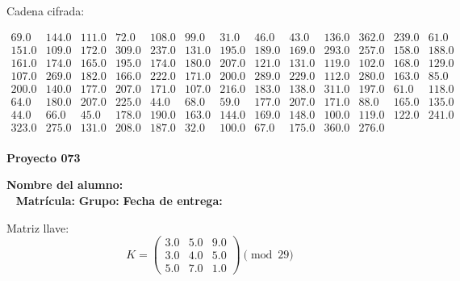 \documentclass[12pt]{article}
\begin{document}
Cadena cifrada:
\begin{center}
$\begin{array}{lllllllllllll}
69.0 & 144.0 & 111.0 & 72.0 & 108.0 & 99.0 & 31.0 & 46.0 & 43.0 & 136.0 & 362.0 & 239.0 & 61.0\\
151.0 & 109.0 & 172.0 & 309.0 & 237.0 & 131.0 & 195.0 & 189.0 & 169.0 & 293.0 & 257.0 & 158.0 & 188.0\\
161.0 & 174.0 & 165.0 & 195.0 & 174.0 & 180.0 & 207.0 & 121.0 & 131.0 & 119.0 & 102.0 & 168.0 & 129.0\\
107.0 & 269.0 & 182.0 & 166.0 & 222.0 & 171.0 & 200.0 & 289.0 & 229.0 & 112.0 & 280.0 & 163.0 & 85.0\\
200.0 & 140.0 & 177.0 & 207.0 & 171.0 & 107.0 & 216.0 & 183.0 & 138.0 & 311.0 & 197.0 & 61.0 & 118.0\\
64.0 & 180.0 & 207.0 & 225.0 & 44.0 & 68.0 & 59.0 & 177.0 & 207.0 & 171.0 & 88.0 & 165.0 & 135.0\\
44.0 & 66.0 & 45.0 & 178.0 & 190.0 & 163.0 & 144.0 & 169.0 & 148.0 & 100.0 & 119.0 & 122.0 & 241.0\\
323.0 & 275.0 & 131.0 & 208.0 & 187.0 & 32.0 & 100.0 & 67.0 & 175.0 & 360.0 & 276.0\\
\end{array}$
\end{center}

\newpage


\textbf{Proyecto 073}

\textbf{Nombre del alumno:} \underline{\hspace{13cm}}\\\
\vspace{1cm}
\textbf{Matrícula:} \underline{\hspace{4cm}} \hspace{1cm}
\textbf{Grupo:} \underline{\hspace{2cm}}
\textbf{Fecha de entrega:} \underline{\hspace{2cm}}

\medskip

Matriz llave:
\[
K = \begin{pmatrix}
3.0 & 5.0 & 9.0\\
3.0 & 4.0 & 5.0\\
5.0 & 7.0 & 1.0
\end{pmatrix} \pmod{29}
\]
\end{document}
